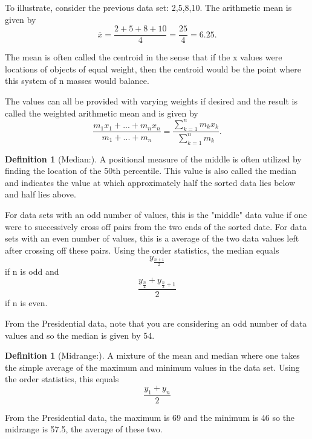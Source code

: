 \documentclass[10pt,]{book}
\theoremstyle{plain}
\theoremstyle{definition}
\newtheorem{definition}[theorem]{Definition}
\theoremstyle{definition}
\theoremstyle{definition}
\numberwithin{equation}{section}
\begin{document}
	To illustrate, consider the previous data set: {2,5,8,10}. The arithmetic mean is given by
	\begin{equation*}\overline{x} = \frac{2+5+8+10}{4} = \frac{25}{4} = 6.25.\end{equation*}
\par

	The mean is often called the centroid in the sense that if the x values were locations of objects of equal weight, then the centroid
	would be the point where this system of n masses would balance. 
\par

	The values can all be provided with varying weights if desired and the result is called the weighted arithmetic mean and is given by
		\begin{equation*}
		\frac{m_1 x_1 + ... + m_n x_n}{m_1 + ... + m_n} = \frac{\sum_{k=1}^n m_k x_k}{\sum_{k=1}^n m_k}.
		\end{equation*}
\begin{definition}[{Median:}]\label{definition-8}
A positional measure of the middle is often utilized by finding the location of the 50th percentile. This value is also called the median and indicates the value at which approximately half the sorted data lies below and half lies above.%
\end{definition}
\par

For data sets with an odd number of values, this is the "middle" data value if one were to successively cross off pairs from the two ends of the sorted date. For data sets with an even number of values, this is a average of the two data values left after crossing off these pairs.  Using the order statistics, the median equals
	\begin{equation*}y_{\frac{n+1}{2}}\end{equation*}
if n is odd and
	\begin{equation*}\frac{y_\frac{n}{2} + y_{\frac{n}{2}+1}}{2}\end{equation*}
if n is even.
%
\par
From the Presidential data, note that you are considering an odd number of data values and so the median is given by 54. %
\begin{definition}[{Midrange:}]\label{definition-9}
A mixture of the mean and median where one takes the simple average of the maximum and minimum values in the data set. Using the order statistics, this equals 
	\begin{equation*}\frac{y_1+y_n}{2}\end{equation*}
%
\end{definition}
\par
From the Presidential data, the maximum is 69 and the minimum is 46 so the midrange is 57.5, the average of these two. %
\par
\end{document}
